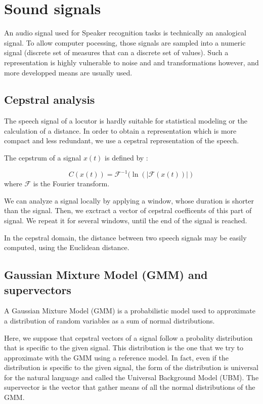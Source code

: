 \documentclass[conference]{IEEEtran}
\begin{document}
\section{Sound signals}

An audio signal used for Speaker recognition tasks is technically an analogical
signal. To allow computer pocessing, those signals are sampled into a numeric
signal (discrete set of measures that can a discrete set of values). Such a
representation is highly vulnerable to noise and and transformations however,
and more developped means are usually used.

\subsection{Cepstral analysis}

The speech signal of a locutor is hardly suitable for statistical modeling or
the calculation of a distance.
In order to obtain a representation which is more compact and less redundant, we
use a cepstral representation of the speech. 

The cepstrum of a signal $x(t)$ is defined by :

$$C(x(t)) = \mathcal{F}^{-1}(\ln(|\mathcal{F}(x(t))|)$$
where $\mathcal{F}$ is the Fourier transform.


We can analyze a signal locally by applying a window, whose duration is shorter
than the signal. Then, we exctract a vector of cepstral coefficents of this part
of signal. We repeat it for several windows, until the end of the signal is
reached. 

In the cepstral domain, the distance between two speech signals may be easily
computed, using the Euclidean distance. 


\subsection{Gaussian Mixture Model (GMM) and supervectors}

A Gaussian Mixture Model (GMM) is a probabilistic model used to approximate a 
distribution of random variables as a sum of normal distributions. 

Here, we suppose that cepstral vectors of a signal follow a probality
distribution that is specific to the given signal. This distribution is the one
that we try to approximate with the GMM using a reference model. In fact, even 
if the distribution is specific to the given signal, the form of the 
distribution is universal for the natural language and called the Universal 
Background Model (UBM). The supervector is the vector that gather means of 
all the normal distributions of the GMM.  \\
\end{document}
